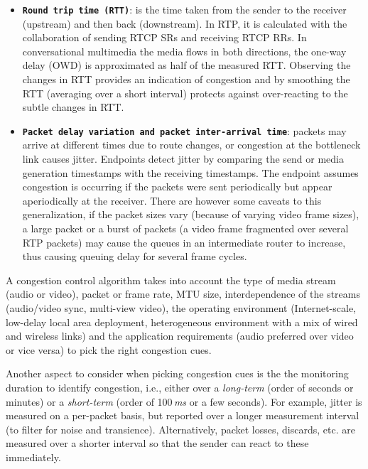 \begin{itemize}

\item \textbf{\texttt{Round trip time (RTT)}}: is the time taken from the
sender to the receiver (upstream) and then back (downstream). In RTP, it is
calculated with the collaboration of sending RTCP SRs and receiving RTCP RRs.
In conversational multimedia the media flows in both directions, the one-way
delay (OWD) is approximated as half of the measured RTT. Observing the changes
in RTT provides an indication of congestion and by smoothing the RTT
(averaging over a short interval) protects against over-reacting to the subtle
changes in RTT.

\item \textbf{\texttt{Packet delay variation and packet inter-arrival time}}:
packets may arrive at different times due to route changes, or congestion at
the bottleneck link causes jitter. Endpoints detect jitter by comparing the
send or media generation timestamps with the receiving timestamps. The
endpoint assumes congestion is occurring if the packets were sent periodically
but appear aperiodically at the receiver. There are however some caveats to
this generalization, if the packet sizes vary (because of varying video frame
sizes), a large packet or a burst of packets (a video frame fragmented over
several RTP packets) may cause the queues in an intermediate router to
increase, thus causing queuing delay for several frame cycles.


\end{itemize}

A congestion control algorithm takes into account the type of media stream
(audio or video), packet or frame rate, MTU size, interdependence of the
streams (audio/video sync, multi-view video), the operating environment
(Internet-scale, low-delay local area deployment, heterogeneous environment
with a mix of wired and wireless links) and the application requirements
(audio preferred over video or vice versa) to pick the right congestion cues.

Another aspect to consider when picking congestion cues is the the monitoring
duration to identify congestion, i.e., either over a \emph{long-term} (order
of seconds or minutes) or a \emph{short-term} (order of 100\,\emph{ms} or a
few seconds). For example, jitter is measured on a per-packet basis, but
reported over a longer measurement interval (to filter for noise and
transience). Alternatively, packet losses, discards, etc. are measured over a
shorter interval so that the sender can react to these immediately.

